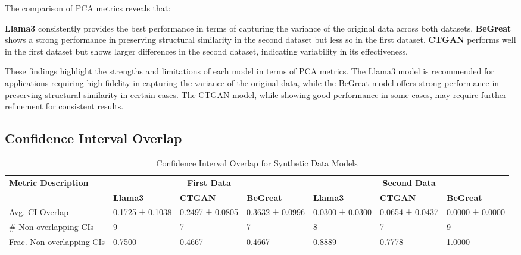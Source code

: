 The comparison of PCA metrics reveals that:

\textbf{Llama3} consistently provides the best performance in terms of capturing the variance of the original data across both datasets.
\textbf{BeGreat} shows a strong performance in preserving structural similarity in the second dataset but less so in the first dataset.
\textbf{CTGAN} performs well in the first dataset but shows larger differences in the second dataset, indicating variability in its effectiveness.

\vspace{0.5cm}

These findings highlight the strengths and limitations of each model in terms of PCA metrics. The Llama3 model is recommended for applications requiring high fidelity in capturing the variance of the original data, while the BeGreat model offers strong performance in preserving structural similarity in certain cases. The CTGAN model, while showing good performance in some cases, may require further refinement for consistent results.








\subsection{Confidence Interval Overlap}

\begin{table}[H]
\centering
\caption{Confidence Interval Overlap for Synthetic Data Models}
\label{tab:ci_overlap_combined}
\begin{tabularx}{\textwidth}{l*{6}{X}}
    \toprule
    \textbf{Metric Description} & \multicolumn{3}{c}{\textbf{First Data}} & \multicolumn{3}{c}{\textbf{Second Data}} \\
    \cmidrule(lr){2-4} \cmidrule(lr){5-7}
    & \textbf{Llama3} & \textbf{CTGAN} & \textbf{BeGreat} & \textbf{Llama3} & \textbf{CTGAN} & \textbf{BeGreat} \\
    \midrule
    Avg. CI Overlap & 0.1725 ± 0.1038 & 0.2497 ± 0.0805 & 0.3632 ± 0.0996 & 0.0300 ± 0.0300 & 0.0654 ± 0.0437 & 0.0000 ± 0.0000 \\
    \# Non-overlapping CIs & 9 & 7 & 7 & 8 & 7 & 9 \\
    Frac. Non-overlapping CIs & 0.7500 & 0.4667 & 0.4667 & 0.8889 & 0.7778 & 1.0000 \\
    \bottomrule
\end{tabularx}
\end{table}



